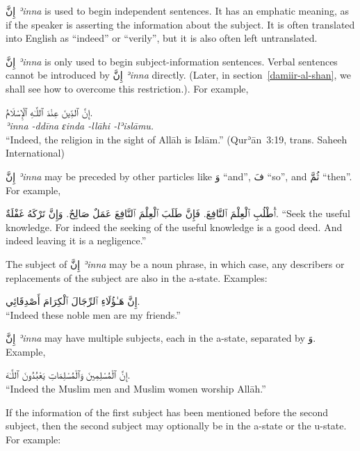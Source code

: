 \documentclass[
  10pt,
]{book}
\begin{document}
\foreignlanguage{arabic}{إِنَّ} \emph{ʾinna} is used to begin independent sentences. It has an emphatic meaning, as if the speaker is asserting the information about the subject. It is often translated into English as \enquote{indeed} or \enquote{verily}, but it is also often left untranslated.

\foreignlanguage{arabic}{إِنَّ} \emph{ʾinna} is only used to begin subject-information sentences. Verbal sentences cannot be introduced by \foreignlanguage{arabic}{إِنَّ} \emph{ʾinna} directly. (Later, in section~\ref{damiir-al-shan}, we shall see how to overcome this restriction.). For example,

\foreignlanguage{arabic}{إِنَّ ٱلدِّينَ عِنْدَ ٱللَّـٰهِ ٱلْإِسْلَامُ.}\\
\emph{ʾinna -ddīna ɛinda -llāhi -lʾislāmu.}\\
\enquote{Indeed, the religion in the sight of Allāh is Islām.} (Qurʾān~3:19, trans. Saheeh International)

\foreignlanguage{arabic}{إِنَّ} \emph{ʾinna}
may be preceded by other particles like \foreignlanguage{arabic}{وَ} \enquote{and}, \foreignlanguage{arabic}{فَ} \enquote{so}, and \foreignlanguage{arabic}{ثُمَّ} \enquote{then}. For example,

\foreignlanguage{arabic}{ٱُطْلُبِ ٱلْعِلْمَ ٱلنَّافِعَ. فَإِنَّ طَلَبَ ٱلْعِلْمَ ٱلنَّافِعَ عَمَلٌ صَالِحٌ. وَإِنَّ تَرْکَهُ غَفْلَةٌ.}
\enquote{Seek the useful knowledge. For indeed the seeking of the useful knowledge is a good deed. And indeed leaving it is a negligence.}

The subject of
\foreignlanguage{arabic}{إِنَّ} \emph{ʾinna}
may be a noun phrase, in which case, any describers or replacements of the subject are also in the a-state. Examples:

\foreignlanguage{arabic}{إِنَّ هَـٰؤُلَاءِ ٱلرِّجَالَ ٱلْکِرَامَ أَصْدِقَائِي.}\\
\enquote{Indeed these noble men are my friends.}

\foreignlanguage{arabic}{إِنَّ} \emph{ʾinna} may have multiple subjects, each in the a-state, separated by \foreignlanguage{arabic}{وَ}. Example,

\foreignlanguage{arabic}{إِنَّ ٱلْمُسْلِمِينَ وَٱلْمُسْلِمَاتِ يَعْبُدُونَ ٱللَّـٰهَ.}\\
\enquote{Indeed the Muslim men and Muslim women worship Allāh.}

If the information of the first subject has been mentioned before the second subject, then the second subject may optionally be in the a-state or the u-state. For example:
\end{document}
